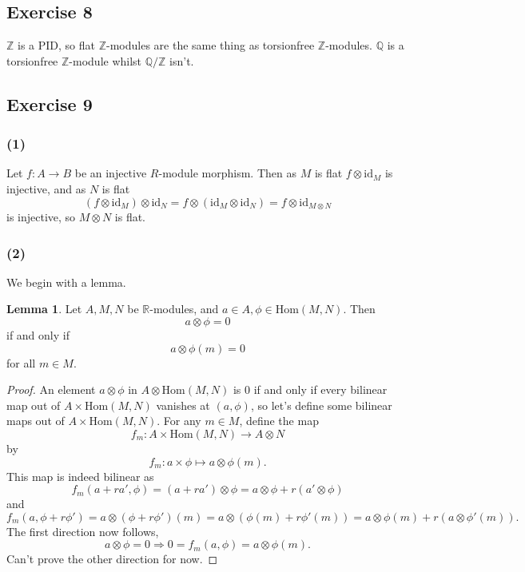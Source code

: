 \documentclass{article}
\theoremstyle{definition}
\newtheorem{lemma}[theorem]{Lemma}
\newcommand{\Z}{\mathbb{Z}}
\newcommand{\Q}{\mathbb{Q}}
\newcommand{\R}{\mathbb{R}}
\newcommand{\Hom}{\text{Hom}}
\newcommand{\id}{\text{id}}
\begin{document}
\subsection*{Exercise 8}

$\Z$ is a PID, so flat $\Z$-modules are the same thing as torsionfree
$\Z$-modules. $\Q$ is a torsionfree $\Z$-module whilst $\Q/\Z$ isn't. 

\subsection*{Exercise 9}

\subsubsection*{(1)}
Let $f : A \to B$ be an injective $R$-module morphism. Then as $M$ is flat $f
\otimes \id_M$ is injective, and as $N$ is flat
\[
	(f \otimes \id_M) \otimes \id_N = f \otimes (\id_M \otimes \id_N) = f \otimes \id_{M \otimes N}
\]
is injective, so $M \otimes N$ is flat. 

\subsubsection*{(2)}

We begin with a lemma.
\begin{lemma}
	Let $A, M, N$ be $\R$-modules, and $a \in A, \phi \in \Hom(M, N)$. Then
	\[
		a \otimes \phi = 0
	\]
	if and only if
	\[
		a \otimes \phi(m) = 0
	\]
	for all $m \in M$.
\end{lemma}
\begin{proof}
	An element $a \otimes \phi$ in $A \otimes \Hom(M, N)$ is $0$ if and only if
	every bilinear map out of $A \times \Hom(M, N)$ vanishes at $(a, \phi)$, so
	let's define some bilinear maps out of $A \times \Hom(M, N)$. For any $m
	\in M$, define the map 
	\[
		f_m : A \times \Hom(M, N) \to A \otimes N
	\] 
	by
	\[
		f_m : a \times \phi \mapsto a \otimes \phi(m).
	\] 
	This map is indeed bilinear as 
	\[
		f_m(a + ra', \phi) 
		= 
		(a + ra') \otimes \phi
		=
		a	\otimes \phi
		+
		r(a' \otimes \phi)
	\] 
	and
	\[
		f_m(a, \phi + r\phi')
		=
		a \otimes (\phi + r\phi')(m)
		=
		a \otimes (\phi(m) + r\phi'(m))
		=
		a \otimes \phi(m)
		+
		r(a \otimes \phi'(m)).
	\] 
	The first direction now follows,
	\[
		a \otimes \phi = 0 
		\Rightarrow
		0 = f_m(a, \phi) = a \otimes \phi(m).
	\]
	Can't prove the other direction for now.
\end{proof}
\end{document}
